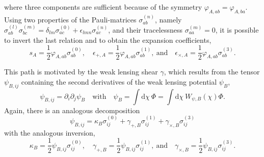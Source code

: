\documentclass[a4paper,fleqn,usenatbib]{mnras}
\newcommand{\dd}{\mathrm{d}}
\begin{document}
where three components are sufficient because of the symmetry $\varphi_{A,ab} = \varphi_{A,ba}$. Using two properties of the Pauli-matrices $\sigma_{ab}^{(n)}$, namely $\sigma_{ab}^{(l)}\sigma_{bc}^{(m)} = \delta_{lm}\sigma^{(0)}_{ac} + \epsilon_{lmn}\sigma^{(n)}_{ac}$, and their tracelessness $\sigma^{(m)}_{aa} = 0$, it is possible to invert the last relation and to obtain the expansion coefficients,
\begin{equation}
s_A = \frac{1}{2}\varphi_{A,ab}\sigma^{(0)}_{ab},
\quad
\epsilon_{+,A} = \frac{1}{2}\varphi_{A,ab}\sigma^{(1)}_{ab},
\mathrm{~and}\quad
\epsilon_{\times,A} = \frac{1}{2}\varphi_{A,ab}\sigma^{(3)}_{ab}.
\end{equation}

This path is motivated by the weak lensing shear $\gamma$, which results from the tensor $\psi_{B,ij}$ containing the second derivatives of the weak lensing potential $\psi_B$,
\begin{equation}
\psi_{B,ij} = \partial_i\partial_j\psi_B
\quad\mathrm{with}\quad
\psi_B = \int\dd\chi\:\Phi = \int\dd\chi\:W_{\psi,B}(\chi)\Phi.
\end{equation}
Again, there is an analogous decomposition
\begin{equation}
\psi_{B,ij} = \kappa_B\sigma^{(0)}_{ij} + \gamma_{+,B}\sigma^{(1)}_{ij} +\gamma_{\times,B}\sigma^{(3)}_{ij}
\end{equation}
with the analogous inversion,
\begin{equation}
\kappa_B = \frac{1}{2}\psi_{B,ij}\sigma^{(0)}_{ij},
\quad
\gamma_{+,B} = \frac{1}{2}\psi_{B,ij}\sigma^{(1)}_{ij},
\mathrm{~and}\quad
\gamma_{\times,B} = \frac{1}{2}\psi_{B,ij}\sigma^{(3)}_{ij}.
\end{equation}
\end{document}
